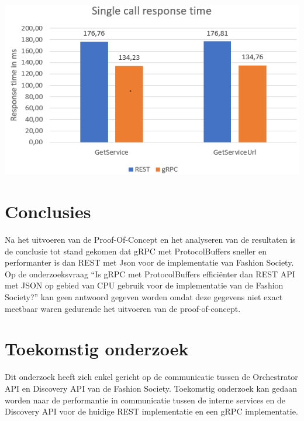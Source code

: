 \documentclass[a0,portrait]{a0poster}
\begin{document}
\begin{multicols}{2}
\begin{center}\vspace{1cm}
	\includegraphics[width=1.0\linewidth]{singleCall}
\end{center}\vspace{1cm}





\color{HoGentAccent1} 
\section*{Conclusies}
\color{black}
Na het uitvoeren van de Proof-Of-Concept en het analyseren van de resultaten is de conclusie tot stand gekomen dat gRPC met ProtocolBuffers sneller en performanter is dan REST met Json voor de implementatie van Fashion Society. Op de onderzoeksvraag “Is gRPC met ProtocolBuffers efficiënter dan REST API met JSON op gebied van CPU gebruik voor de implementatie van de Fashion Society?” kan geen antwoord gegeven worden omdat deze gegevens niet exact meetbaar waren gedurende het uitvoeren van de proof-of-concept.
\color{HoGentAccent1} 
\section*{Toekomstig onderzoek}
\color{black}

Dit onderzoek heeft zich enkel gericht op de communicatie tussen de Orchestrator API en Discovery API van de Fashion Society. Toekomstig onderzoek kan gedaan worden naar de performantie in communicatie tussen de interne services en de Discovery API voor de huidige REST implementatie en een gRPC implementatie.


\end{multicols}
\end{document}
